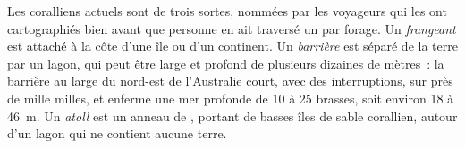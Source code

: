 Les  coralliens actuels sont de trois sortes, nommées par les voyageurs qui les ont cartographiés
bien avant que personne en ait traversé un par forage. Un  \emph{frangeant} est attaché à
la côte d'une île ou d'un continent. Un  \emph{barrière} est séparé de
la terre par un lagon, qui peut être large et profond de plusieurs dizaines de mètres~: la barrière
au large du nord-est de l'Australie court, avec des interruptions, sur près de mille milles,
et enferme une mer profonde de 10 à 25 brasses, soit environ 18 à \qty{46}{m}. Un
\emph{atoll} est un anneau de , portant de basses îles de sable corallien, autour d'un
lagon qui ne contient aucune terre.

